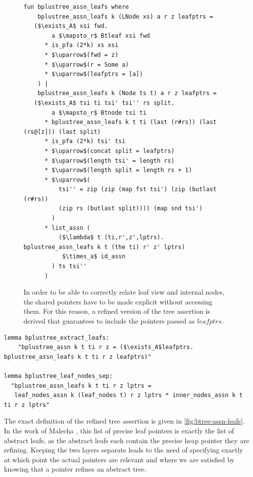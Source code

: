 \documentclass[a4paper,UKenglish,cleveref, autoref, thm-restate]{lipics-v2021}
\begin{document}
\begin{figure}
    \centering
\begin{lstlisting}[mathescape=true, language=Isabelle,label=lst:btree-assn-leafs]
fun bplustree_assn_leafs where
    bplustree_assn_leafs k (LNode xs) a r z leafptrs =
   ($\exists_A$ xsi fwd.
        a $\mapsto_r$ Btleaf xsi fwd
      * is_pfa (2*k) xs xsi
      * $\uparrow$(fwd = z)
      * $\uparrow$(r = Some a)
      * $\uparrow$(leafptrs = [a])
    ) |
    bplustree_assn_leafs k (Node ts t) a r z leafptrs =
   ($\exists_A$ tsi ti tsi' tsi'' rs split.
        a $\mapsto_r$ Btnode tsi ti
      * bplustree_assn_leafs k t ti (last (r#rs)) (last (rs@[z])) (last split)
      * is_pfa (2*k) tsi' tsi
      * $\uparrow$(concat split = leafptrs)
      * $\uparrow$(length tsi' = length rs)
      * $\uparrow$(length split = length rs + 1)
      * $\uparrow$(
          tsi'' = zip (zip (map fst tsi') (zip (butlast (r#rs))
          (zip rs (butlast split)))) (map snd tsi')
        )
      * list_assn (
          ($\lambda$ t (ti,r',z',lptrs). bplustree_assn_leafs k t (the ti) r' z' lptrs)
           $\times_a$ id_assn
        ) ts tsi''
      )
\end{lstlisting}
    \caption[Definition of extracted leafs assertion]{
        In order to be able to correctly relate leaf view and internal nodes,
        the shared pointers have to be made explicit without accessing them.
        For this reason, a refined version of the tree assertion is derived
        that guarantees to include the pointers passed as $leafptrs$.
    }
    \label{fig:btree-assn-leafs}
\end{figure}


\begin{lstlisting}[mathescape=true, language=Isabelle,label=lst:btree-view-split]
lemma bplustree_extract_leafs:
    "bplustree_assn k t ti r z = ($\exists_A$leafptrs. bplustree_assn_leafs k t ti r z leafptrs)"

lemma bplustree_leaf_nodes_sep:
  "bplustree_assn_leafs k t ti r z lptrs =
   leaf_nodes_assn k (leaf_nodes t) r z lptrs * inner_nodes_assn k t ti r z lptrs"
\end{lstlisting}

The exact definition of the refined tree assertion is given in \autoref{fig:btree-assn-leafs}.
In the work of Malecha \cite{DBLP:conf/popl/MalechaMSW10}, 
this list of precise leaf pointers is exactly the list of abstract leafs,
as the abstract leafs each contain the precise heap pointer they are refining.
Keeping the two layers separate leads to the need of specifying
exactly at which point the actual pointers are relevant
and where we are satisfied by knowing that a pointer refines
an abstract tree.
\end{document}
